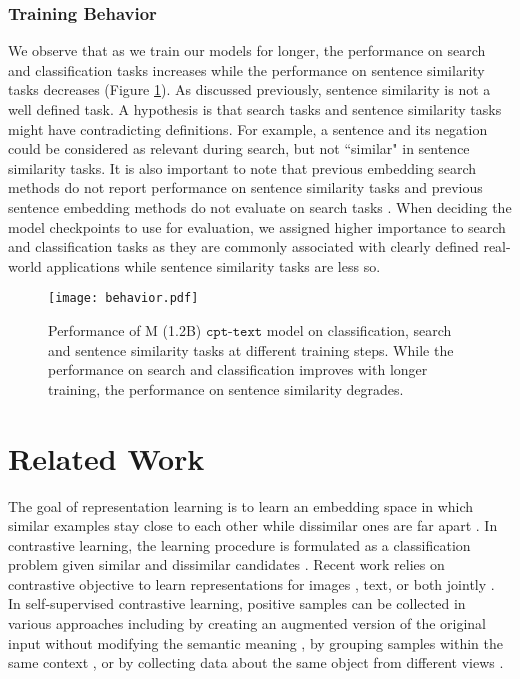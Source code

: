 \documentclass[nohyperref]{article}
\begin{document}
\subsubsection{Training Behavior}
\label{sec:behavior}

We observe that as we train our models for longer, the performance on search and classification tasks increases while the performance on sentence similarity tasks decreases (Figure \ref{fig:behavior}). As discussed previously, sentence similarity is not a well defined task. A hypothesis is that search tasks and sentence similarity tasks might have contradicting definitions. For example, a sentence and its negation could be considered as relevant during search, but  not ``similar" in sentence similarity tasks. It is also important to note that previous embedding search methods do not report performance on sentence similarity tasks \cite{dpr, e2e, contreiver} and previous sentence embedding methods do not evaluate on search tasks \cite{sbert,declutr,simcse}. When deciding the model checkpoints to use for evaluation, we assigned higher importance to search and classification tasks as they are commonly associated with clearly defined real-world applications while sentence similarity tasks are less so. 



\begin{figure}[h]
\centering
\texttt{[image: behavior.pdf]}
\caption{Performance of M (1.2B) $\texttt{cpt-text}$ model on classification, search and sentence similarity tasks at different training steps. While the performance on search and classification improves with longer training, the performance on sentence similarity degrades.}
\label{fig:behavior}
\end{figure}


\section{Related Work}
The goal of representation learning \cite{bengio} is to learn an embedding space in which similar examples stay close to each other while dissimilar ones are far apart \cite{hadsell}. In contrastive learning, the learning procedure is formulated as a classification problem given similar and dissimilar candidates \cite{chopra,Gutmann,Schroff,inbatch,Oord}. Recent work relies on contrastive objective to learn representations for images \cite{wu,He,Chen,Zbontar}, text, or both jointly \cite{Lu,Sun,Kim,clip,Khosla}. In self-supervised contrastive learning, positive samples can be collected in various approaches including by creating an augmented version of the original input without modifying the semantic meaning \cite{simcse}, by grouping samples within the same context \cite{declutr,contreiver}, or by collecting data about the same object from different views \cite{tian}. 
\end{document}
